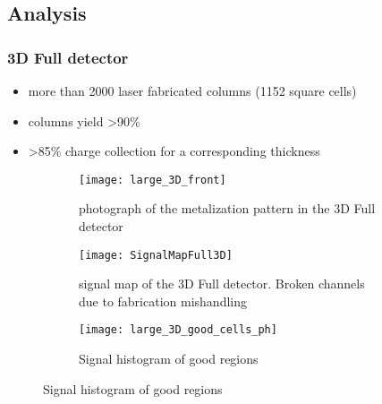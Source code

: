 \subsection{Analysis}
\begin{frame}
  \frametitle{3D Full detector}
  \begin{itemize}
    \item more than 2000 laser fabricated columns (1152 square cells)    
    \item columns yield >90\%
    \item >85\% charge collection for a corresponding thickness
  \end{itemize}
  \begin{figure}
    \centering
    \begin{subfigure}[b]{0.3\textwidth}
      \texttt{[image: large\_3D\_front]}
      \caption{photograph of the metalization pattern in the 3D Full detector}
      \label{fig:3DMetal}
    \end{subfigure}
    \begin{subfigure}[b]{0.3\textwidth}
      \texttt{[image: SignalMapFull3D]}
      \caption{signal map of the 3D Full detector. Broken channels due to fabrication mishandling}
      \label{fig:3dSignalMap}
    \end{subfigure}
    \begin{subfigure}[b]{0.3\textwidth}
      \texttt{[image: large\_3D\_good\_cells\_ph]}
      \caption{Signal histogram of good regions}
      \label{fig:3dhisto}
    \end{subfigure}
  \end{figure}
\end{frame}


